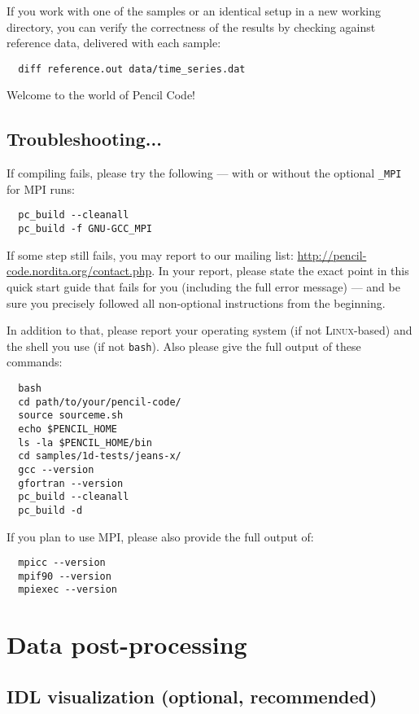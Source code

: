 \documentclass[a4paper,12pt]{article}
\newcommand{\command}[1]{\texttt{#1}}
\newcommand{\name}[1]{\textsc{#1}}
\begin{document}
If you work with one of the samples or an identical setup in a new working directory, you can verify the correctness of the results
by checking against reference data, delivered with each sample:
\begin{verbatim}
  diff reference.out data/time_series.dat
\end{verbatim}

Welcome to the world of Pencil Code!

\subsection{Troubleshooting...}

If compiling fails, please try the following --- with or without the optional \command{\_MPI} for \name{MPI} runs:
\begin{verbatim}
  pc_build --cleanall
  pc_build -f GNU-GCC_MPI
\end{verbatim}

If some step still fails, you may report to our mailing list: \url{http://pencil-code.nordita.org/contact.php}.
In your report, please state the exact point in this quick start guide that fails for you (including the full error message) --- and be sure you precisely followed all non-optional instructions from the beginning.

In addition to that, please report your operating system (if not \name{Linux}-based) and the shell you use (if not \command{bash}).
Also please give the full output of these commands:
\begin{verbatim}
  bash
  cd path/to/your/pencil-code/
  source sourceme.sh
  echo $PENCIL_HOME
  ls -la $PENCIL_HOME/bin
  cd samples/1d-tests/jeans-x/
  gcc --version
  gfortran --version
  pc_build --cleanall
  pc_build -d
\end{verbatim}

If you plan to use \name{MPI}, please also provide the full output of:
\begin{verbatim}
  mpicc --version
  mpif90 --version
  mpiexec --version
\end{verbatim}

\section{Data post-processing}

\subsection{IDL visualization (optional, recommended)}
\end{document}
